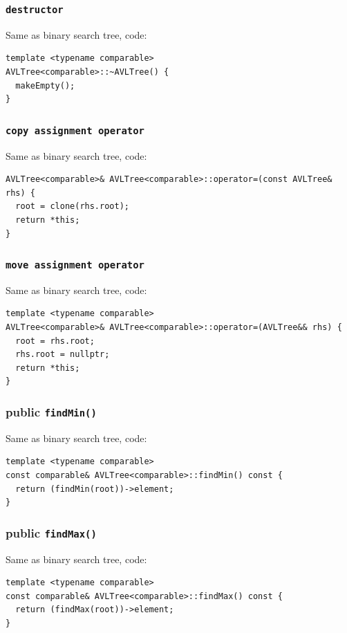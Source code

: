 \documentclass[12pt]{book}
\begin{document}
\subsubsection{\texttt{destructor}}
\label{sec:org7fca1d4}
Same as binary search tree, code:
\begin{verbatim}
template <typename comparable>
AVLTree<comparable>::~AVLTree() {
  makeEmpty();
}
\end{verbatim}
\subsubsection{\texttt{copy assignment operator}}
\label{sec:org52cf2fb}
Same as binary search tree, code:
\begin{verbatim}
AVLTree<comparable>& AVLTree<comparable>::operator=(const AVLTree& rhs) {
  root = clone(rhs.root);
  return *this;
}
\end{verbatim}
\subsubsection{\texttt{move assignment operator}}
\label{sec:orgd71e1db}
Same as binary search tree, code:
\begin{verbatim}
template <typename comparable>
AVLTree<comparable>& AVLTree<comparable>::operator=(AVLTree&& rhs) {
  root = rhs.root;
  rhs.root = nullptr;
  return *this;
}
\end{verbatim}
\subsubsection{public \texttt{findMin()}}
\label{sec:org58f7e18}
Same as binary search tree, code:
\begin{verbatim}
template <typename comparable>
const comparable& AVLTree<comparable>::findMin() const {
  return (findMin(root))->element;
}
\end{verbatim}
\subsubsection{public \texttt{findMax()}}
\label{sec:org81016f2}
Same as binary search tree, code:
\begin{verbatim}
template <typename comparable>
const comparable& AVLTree<comparable>::findMax() const {
  return (findMax(root))->element;
}
\end{verbatim}
\end{document}
